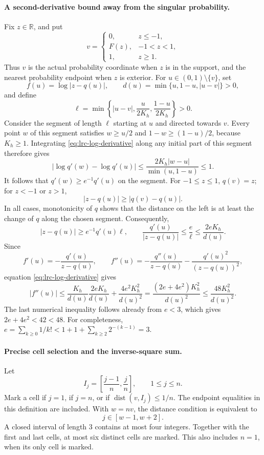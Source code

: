 \paragraph{A second-derivative bound away from the singular probability.}
Fix $z\in\mathbb R$, and put
\[
 v=\begin{cases}
 0,&z\leq-1,\\
 F(z),&-1<z<1,\\
 1,&z\geq1.
 \end{cases}
\]
Thus $v$ is the actual probability coordinate when $z$ is in the
support, and the nearest probability endpoint when $z$ is exterior.
For $u\in(0,1)\setminus\{v\}$, set
\[
 f(u)=\log|z-q(u)|,\qquad
 d(u)=\min\{u,1-u,|u-v|\}>0,
\]
and define
\[
 \ell=\min\left\{|u-v|,\frac{u}{2K_h},
                              \frac{1-u}{2K_h}\right\}>0.
\]
Consider the segment of length $\ell$ starting at $u$ and directed
towards $v$. Every point $w$ of this segment satisfies
$w\geq u/2$ and $1-w\geq(1-u)/2$, because $K_h\geq1$.
Integrating \eqref{eq:lrc-log-derivative} along any initial part of
this segment therefore gives
\[
 |\log q'(w)-\log q'(u)|
 \leq\frac{2K_h|w-u|}{\min(u,1-u)}\leq1.
\]
It follows that $q'(w)\geq e^{-1}q'(u)$ on the segment.
For $-1\leq z\leq1$, $q(v)=z$; for $z<-1$ or $z>1$,
\[
 |z-q(u)|\geq|q(v)-q(u)|.
\]
In all cases, monotonicity of $q$ shows that the distance on the
left is at least the change of $q$ along the chosen segment.
Consequently,
\[
 |z-q(u)|\geq e^{-1}q'(u)\ell,
 \qquad
 \frac{q'(u)}{|z-q(u)|}
 \leq\frac e\ell
 \leq\frac{2eK_h}{d(u)}.
\]
Since
\[
 f'(u)=-\frac{q'(u)}{z-q(u)},\qquad
 f''(u)=-\frac{q''(u)}{z-q(u)}
        -\frac{q'(u)^2}{(z-q(u))^2},
\]
equation \eqref{eq:lrc-log-derivative} gives
\[
 |f''(u)|
 \leq\frac{K_h}{d(u)}\frac{2eK_h}{d(u)}
       +\frac{4e^2K_h^2}{d(u)^2}
 =\frac{(2e+4e^2)K_h^2}{d(u)^2}
 \leq\frac{48K_h^2}{d(u)^2}.
\]
The last numerical inequality follows already from $e<3$, which
gives $2e+4e^2<42<48$. For completeness,
$e=\sum_{k\geq0}1/k!<1+1+\sum_{k\geq2}2^{-(k-1)}=3$.

\paragraph{Precise cell selection and the inverse-square sum.}
Let
\[
 I_j=\left[\frac{j-1}{n},\frac jn\right],\qquad1\leq j\leq n.
\]
Mark a cell if $j=1$, if $j=n$, or if
$\operatorname{dist}(v,I_j)\leq1/n$. The endpoint equalities in
this definition are included. With $w=nv$, the distance condition is
equivalent to
\[
 j\in[w-1,w+2].
\]
A closed interval of length $3$ contains at most four integers.
Together with the first and last cells, at most six distinct cells
are marked. This also includes $n=1$, when its only cell is marked.

